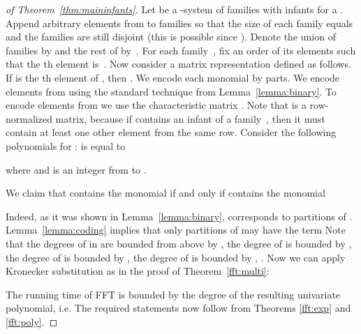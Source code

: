 \begin{proof}[of Theorem~\ref{thm:maininfants}]
Let  be a {-system of families with infants}
for a \newb{}. Append arbitrary elements from  to families so that the size of each family equals  and the families are still disjoint (this is possible since ). Denote the union of  families by  and the rest of  by~. 
For each family~, fix an order of its elements such that
the th element is~. Now consider a matrix representation  defined as follows.  If  is the th element of , then .
We encode each monomial  by parts. We encode elements from  using the standard technique from Lemma~\ref{lemma:binary}. To encode elements from  we use the characteristic matrix . Note that  is a {row-normalized matrix}, because if  contains an infant  of a family~, then it must contain at least one other element from the same row.
Consider the following polynomials for : 
is equal to

where  and  is an integer from  to .

We claim that  contains the monomial 
if and only if  contains the monomial
 
Indeed, as it was shown in Lemma~\ref{lemma:binary},  corresponds to partitions of . Lemma~\ref{lemma:coding} implies that only partitions of  may have the term 
 Note that the degrees of  in  are bounded from above by , the degree of  is bounded by , the degree of  is bounded by , the degree of  is bounded by , .  Now we can apply Kronecker substitution as in the proof of Theorem~\ref{fft:multi}:


\newb{}

The running time of FFT is bounded by the degree of the resulting univariate polynomial, i.e.
\newb{

}
The required statements now follow from Theorems \ref{fft:exp} and \ref{fft:poly}.
\end{proof}





